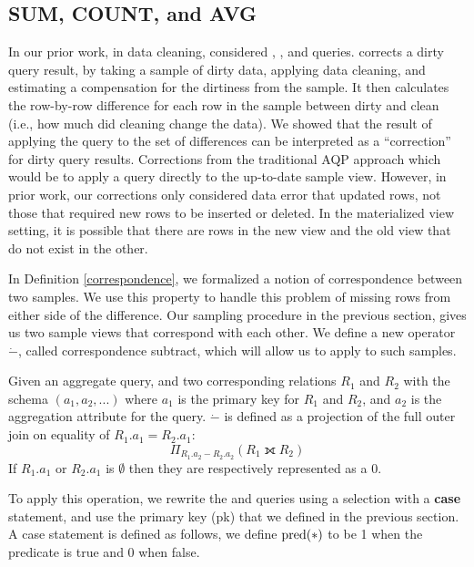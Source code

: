 \subsection{SUM, COUNT, and AVG}
In our prior work, in data cleaning, \nsc considered \sumfunc, \countfunc, and \avgfunc queries.
\nsc corrects a dirty query result, by taking a sample of dirty data, applying data cleaning, and estimating a compensation for the dirtiness from the sample.
It then calculates the row-by-row difference for each row in the sample between dirty and clean (i.e., how much did cleaning change the data).
We showed that the result of applying the query to the set of differences can be interpreted as a ``correction'' for dirty query results. 
Corrections from the traditional AQP approach which would be to apply a query directly to the up-to-date sample view.
However, in prior work, our corrections only considered data error that updated rows, not those that required new rows to be inserted or deleted.
In the materialized view setting, it is possible that there are rows in the new view and the old view that do not exist in the other.

In Definition \ref{correspondence}, we formalized a notion of correspondence between two samples.
We use this property to handle this problem of missing rows from either side of the difference.
Our sampling procedure in the previous section, gives us two sample views that correspond with each other.
We define a new operator $\dot{-}$, called correspondence subtract, which will allow us to apply \nsc to such samples.
\begin{definition} Given an aggregate query, and two corresponding relations $R_1$ and $R_2$ with the schema $(a_1, a_2, ...)$ where $a_1$ is the primary key for $R_1$ and $R_2$, and $a_2$ is the aggregation attribute for the query. 
$\dot{-}$ is defined as a projection of the full outer join on equality of $R_1.a_1 = R_2.a_1$: \[ \Pi_{R_1.a_2 - R_2.a_2} ( R_1 \fullouterjoin R_2 ) \]
If $R_1.a_1$ or $R_2.a_1$ is $\emptyset$ then they are respectively represented as a $0$.
\end{definition}
To apply this operation, we rewrite the \sumfunc and \countfunc queries using a selection with a \textbf{case} statement, and use the primary key (pk) that we defined in the previous section.
A case statement is defined as follows, we define $\textrm{pred}(*)$ to be 1 when the predicate is true and 0 when false.

